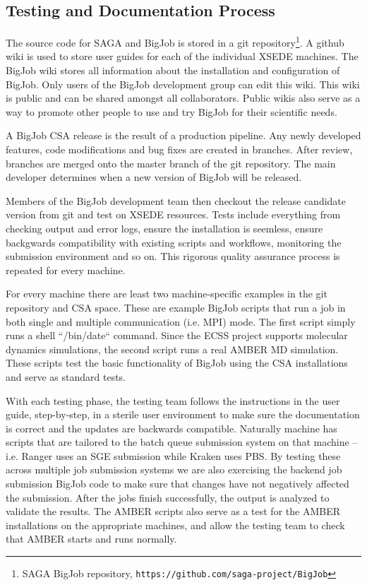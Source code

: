 \documentclass{sig-alternate}
\begin{document}
\subsection{Testing and Documentation Process}

The source code for SAGA and BigJob is stored in a git repository\footnote{
SAGA BigJob repository, {\texttt{https://github.com/saga-project/BigJob}}}.
A github wiki is used to store user guides for each of the individual XSEDE
machines. The BigJob wiki stores all information about the installation and
configuration of BigJob. Only users of the BigJob development group can edit
this wiki. This wiki is public and can be shared amongst all collaborators.
Public wikis also serve as a way to promote other people to use and try BigJob
for their scientific needs.

A BigJob CSA release is the result of a production pipeline. Any newly developed
features, code modifications and bug fixes are created in branches. After
review, branches are merged onto the master branch of the git repository. The
main developer determines when a new version of BigJob will be released. 

Members of the BigJob development team then checkout the release candidate
version from git and test on XSEDE resources. Tests include everything from
checking output and error logs, ensure the installation is seemless, ensure
backgwards compatibility with existing scripts and workflows, monitoring the
submission environment and so on. This rigorous quality assurance process is
repeated for every machine.

For every machine there are least two machine-specific examples in the git
repository and CSA space. These are example BigJob scripts that run a job in
both single and multiple communication (i.e. MPI) mode. The first script simply
runs a shell ``/bin/date`` command. Since the ECSS project supports molecular
dynamics simulations, the second script runs a real AMBER MD simulation. These
scripts test the basic functionality of BigJob using the CSA installations and
serve as standard tests.

With each testing phase, the testing team follows the instructions in the user
guide, step-by-step, in a sterile user environment to make sure the
documentation is correct and the updates are backwards compatible.
Naturally machine has scripts that are tailored to the batch queue submission
system on that machine -- i.e. Ranger uses an SGE submission while Kraken uses
PBS. By testing these across multiple job submission systems we are also
exercising the backend job submission BigJob code to make sure that changes have
not negatively affected the submission. After the jobs finish successfully, the
output is analyzed to validate the results. The AMBER scripts also serve as a
test for the AMBER installations on the appropriate machines, and allow the
testing team to check that AMBER starts and runs normally.
\end{document}
